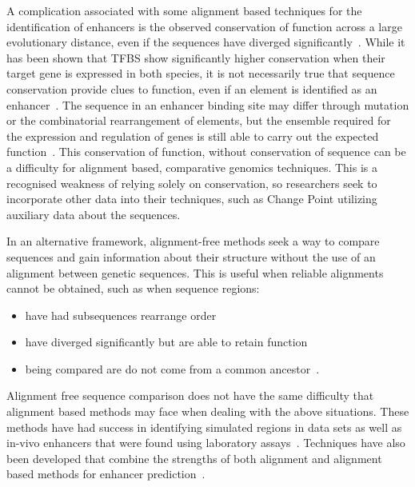          A complication associated with some alignment based techniques for the identification of enhancers is the observed conservation of function across a large evolutionary distance, even if the sequences have diverged significantly~\cite{tautz2000evolution, pennacchio2013enhancers}. While it has been shown that TFBS show significantly higher conservation when their target gene is expressed in both species, it is not necessarily true that sequence conservation provide clues to function, even if an element is identified as an enhancer~\cite{hemberg2011conservation, pennacchio2013enhancers}.
         The sequence in an enhancer binding site may differ through mutation or the combinatorial rearrangement of elements, but the ensemble required for the expression and regulation of genes is still able to carry out the expected function~\cite{wong2014decoupling}. This conservation of function, without conservation of sequence can be a difficulty for alignment based, comparative genomics techniques. This is a recognised weakness of relying solely on conservation, so researchers seek to incorporate other data into their techniques, such as Change Point utilizing auxiliary data about the sequences. 
        
        In an alternative framework, alignment-free methods seek a way to compare sequences and gain information about their structure without the use of an alignment between genetic sequences. 
        This is useful when reliable alignments cannot be obtained, such as when sequence regions: 
            \begin{itemize}
                \item have had subsequences rearrange order%
                \item have diverged significantly but are able to retain function
                \item being compared are do not come from a common ancestor~\cite{song2013new}.
            \end{itemize}
        Alignment free sequence comparison does not have the same difficulty that alignment based methods may face when dealing with the above situations. These methods have had success in identifying simulated regions in data sets as well as in-vivo enhancers that were found using laboratory assays~\cite{goke2012estimation}. Techniques have also been developed that combine the strengths of both alignment and alignment based methods for enhancer prediction~\cite{dolle2015handling}. 
        
